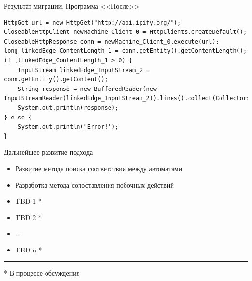\documentclass[12pt]{beamer}
\begin{document}
\begin{frame}[fragile]{Результат миграции. Программа <<После>>}
\begin{verbatim}
HttpGet url = new HttpGet("http://api.ipify.org/");
CloseableHttpClient newMachine_Client_0 = HttpClients.createDefault();
CloseableHttpResponse conn = newMachine_Client_0.execute(url);
long linkedEdge_ContentLength_1 = conn.getEntity().getContentLength();
if (linkedEdge_ContentLength_1 > 0) {
    InputStream linkedEdge_InputStream_2 = conn.getEntity().getContent();
    String response = new BufferedReader(new InputStreamReader(linkedEdge_InputStream_2)).lines().collect(Collectors.joining("\n"));
    System.out.println(response);
} else {
    System.out.println("Error!");
}
\end{verbatim}
\end{frame}

{
\begin{frame}{Дальнейшее развитие подхода}
	\begin{mybox}[]
	\begin{itemize}	
		\item Развитие метода поиска соответствия между автоматами
		\item Разработка метода сопоставления побочных действий
		\item TBD 1 * 
		\item TBD 2 * 
		\item ...
		\item TBD n * 
	\end{itemize}
	
	  \noindent\rule{4cm}{0.4pt}
	  
	  \begingroup
	  \tiny
	    	* В процессе обсуждения
	  \endgroup
	\end{mybox}
\end{frame}
}
\end{document}
